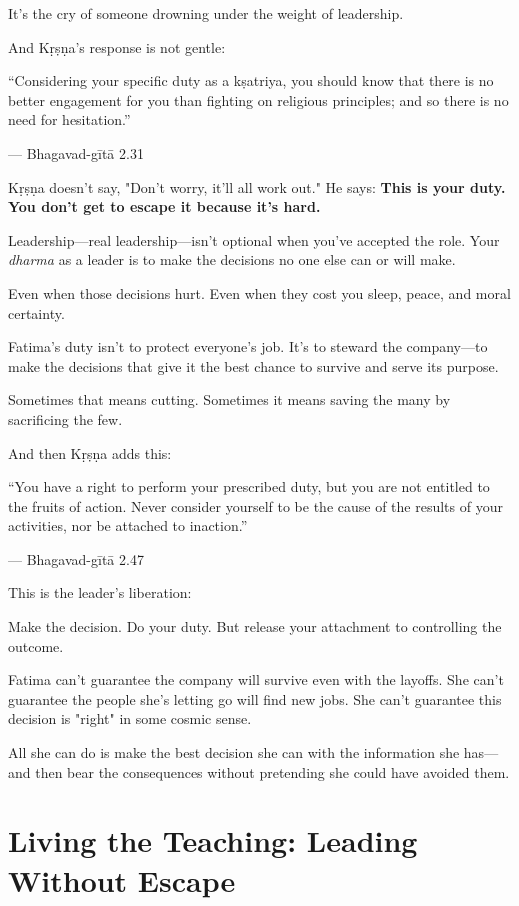 \documentclass[11pt,twoside]{book}
\begin{document}
It's the cry of someone drowning under the weight of leadership.

And Kṛṣṇa's response is not gentle:

\begin{pullquote}
``Considering your specific duty as a kṣatriya, you should know that there is no better engagement for you than fighting on religious principles; and so there is no need for hesitation.''

--- Bhagavad-gītā 2.31
\end{pullquote}

Kṛṣṇa doesn't say, "Don't worry, it'll all work out." He says: \textbf{This is your duty. You don't get to escape it because it's hard.}

Leadership—real leadership—isn't optional when you've accepted the role. Your \emph{dharma} as a leader is to make the decisions no one else can or will make.

Even when those decisions hurt. Even when they cost you sleep, peace, and moral certainty.

Fatima's duty isn't to protect everyone's job. It's to steward the company—to make the decisions that give it the best chance to survive and serve its purpose.

Sometimes that means cutting. Sometimes it means saving the many by sacrificing the few.

And then Kṛṣṇa adds this:

\begin{pullquote}
``You have a right to perform your prescribed duty, but you are not entitled to the fruits of action. Never consider yourself to be the cause of the results of your activities, nor be attached to inaction.''

--- Bhagavad-gītā 2.47
\end{pullquote}

This is the leader's liberation:

Make the decision. Do your duty. But release your attachment to controlling the outcome.

Fatima can't guarantee the company will survive even with the layoffs. She can't guarantee the people she's letting go will find new jobs. She can't guarantee this decision is "right" in some cosmic sense.

All she can do is make the best decision she can with the information she has—and then bear the consequences without pretending she could have avoided them.

\section*{Living the Teaching: Leading Without Escape}
\end{document}
